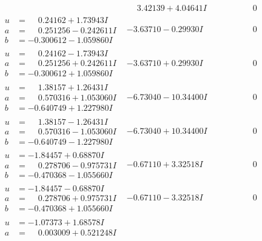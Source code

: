 \documentclass[1p]{elsarticle_modified}
\theoremstyle{definition}
\begin{document}
$$\begin{array}{c|c|c}
 & \phantom{-}3.42139 + 4.04641 I & \phantom{-0.000000 } 0 \\ \hline\begin{aligned}
u &= \phantom{-}0.24162 + 1.73943 I \\
a &= \phantom{-}0.251256 - 0.242611 I \\
b &= -0.300612 - 1.059860 I\end{aligned}
 & -3.63710 - 0.29930 I & \phantom{-0.000000 } 0 \\ \hline\begin{aligned}
u &= \phantom{-}0.24162 - 1.73943 I \\
a &= \phantom{-}0.251256 + 0.242611 I \\
b &= -0.300612 + 1.059860 I\end{aligned}
 & -3.63710 + 0.29930 I & \phantom{-0.000000 } 0 \\ \hline\begin{aligned}
u &= \phantom{-}1.38157 + 1.26431 I \\
a &= \phantom{-}0.570316 + 1.053060 I \\
b &= -0.640749 + 1.227980 I\end{aligned}
 & -6.73040 - 10.34400 I & \phantom{-0.000000 } 0 \\ \hline\begin{aligned}
u &= \phantom{-}1.38157 - 1.26431 I \\
a &= \phantom{-}0.570316 - 1.053060 I \\
b &= -0.640749 - 1.227980 I\end{aligned}
 & -6.73040 + 10.34400 I & \phantom{-0.000000 } 0 \\ \hline\begin{aligned}
u &= -1.84457 + 0.68870 I \\
a &= \phantom{-}0.278706 - 0.975731 I \\
b &= -0.470368 - 1.055660 I\end{aligned}
 & -0.67110 + 3.32518 I & \phantom{-0.000000 } 0 \\ \hline\begin{aligned}
u &= -1.84457 - 0.68870 I \\
a &= \phantom{-}0.278706 + 0.975731 I \\
b &= -0.470368 + 1.055660 I\end{aligned}
 & -0.67110 - 3.32518 I & \phantom{-0.000000 } 0 \\ \hline\begin{aligned}
u &= -1.07373 + 1.68578 I \\
a &= \phantom{-}0.003009 + 0.521248 I \\

\end{aligned}
\end{array}$$
\end{document}
